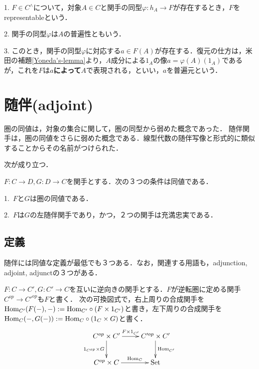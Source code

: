\documentclass[uplatex, dvipdfmx]{jsreport}
\begin{document}
\begin{definition}[表現可能関手]
    
    1. $F\in C^\wedge$について，対象$A\in C$と関手の同型$\varphi :h_A\to F$が存在するとき，$F$をrepresentableという．

    2. 関手の同型$\varphi$は$A$の普遍性ともいう．
    
    3. このとき，関手の同型$\varphi$に対応する$a\in F(A)$が存在する．復元の仕方は，米田の補題\ref{Yoneda's-lemma}より，$A$成分による$1_A$の像$a=\varphi (A)(1_A)$であるが，これを$F$は\textbf{$a$によって}$A$で表現される，といい，$a$を普遍元という．
\end{definition}



\chapter{随伴(adjoint)}
圏の同値は，対象の集合に関して，圏の同型から弱めた概念であった．
随伴関手は，圏の同値をさらに弱めた概念である．線型代数の随伴写像と形式的に類似することからその名前がつけられた．

次が成り立つ．
\begin{proposition}
    $F:C\to D, G:D\to C$を関手とする．次の３つの条件は同値である．\rm{}

    1.\, $F$と$G$は圏の同値である．

    2.\, $F$は$G$の左随伴関手であり，かつ，２つの関手は充満忠実である．
\end{proposition}

\section{定義}
随伴には同値な定義が最低でも３つある．なお，関連する用語も，adjunction, adjoint, adjunctの３つがある．

\begin{notation}
    $F:C\to C',G:C'\to C$を互いに逆向きの関手とする．$F$が逆転圏に定める関手$C^{op}\to C'^{op}$も$F$と書く．
    次の可換図式で，右上周りの合成関手を$\mathrm{Hom}_{C'}(F(-),-):=\mathrm{Hom}_{C'}\circ(F\times 1_{C'})$と書き，左下周りの合成関手を
    $\mathrm{Hom}_{C}(-,G(-)):=\mathrm{Hom}_C\circ(1_C\times G)$と書く．
    \[\xymatrix{
        C^{op}\times C'\ar[r]^-{F\times 1_{C'}}\ar[d]_-{1_{C^{op}}\times G}&C'^{op}\times C'\ar[d]^-{\Hom_{C'}}\\
        C^{op}\times C\ar[r]^-{\Hom_C}&\Set
    }\]
\end{notation}
\end{document}
